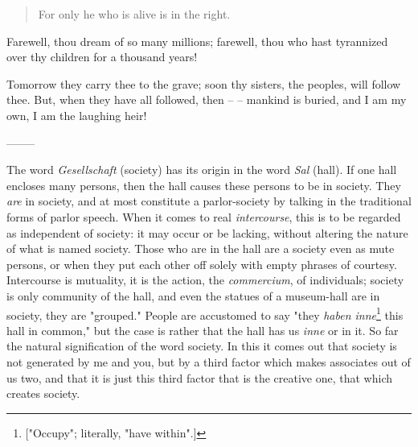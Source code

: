\begin{quotation}

\noindent{}For only he who is alive is in the right.\end{quotation}

\noindent{}Farewell, thou dream of so many millions; farewell, thou who hast 
tyrannized over thy children for a thousand years!

Tomorrow they carry thee to the grave; soon thy sisters, the peoples, will 
follow thee. But, when they have all followed, then -- -- mankind is buried, 
and I am my own, I am the laughing heir!

\begin{center}
--------\end{center}


The word \textit{Gesellschaft} (society) has its origin in the word 
\textit{Sal} (hall). If one hall encloses many persons, then the hall causes 
these persons to be in society. They \textit{are} in society, and at most 
constitute a parlor-society by talking in the traditional forms of parlor 
speech. When it comes to real \textit{intercourse}, this is to be regarded as 
independent of society: it may occur or be lacking, without altering the 
nature of what is named society. Those who are in the hall are a society even 
as mute persons, or when they put each other off solely with empty phrases of 
courtesy. Intercourse is mutuality, it is the action, the \textit{commercium}, 
of individuals; society is only community of the hall, and even the statues of 
a museum-hall are in society, they are "{}grouped."{} People are accustomed to 
say "{}they \textit{haben inne}\footnote{["{}Occupy"{}; literally, "{}have 
within"{}.]} this hall in common,"{} but the case is rather that the hall has 
us \textit{inne} or in it. So far the natural signification of the word 
society. In this it comes out that society is not generated by me and you, but 
by a third factor which makes associates out of us two, and that it is just 
this third factor that is the creative one, that which creates society.

